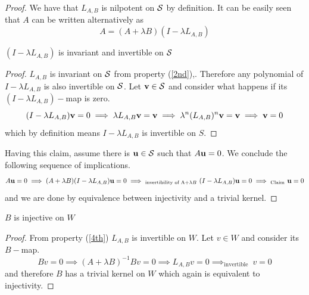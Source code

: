 \begin{proof}
    We have that $L_{A,B}$ is nilpotent on $\mathcal{S}$ by definition. It can be easily seen that $A$ can be written alternatively as
    \begin{equation}\label{expForA}
        A=(A+\lambda B)(I-\lambda L_{A,B})
    \end{equation}

    \begin{claim}\label{cl:newinv}
        $(I-\lambda L_{A,B})$ is invariant and invertible on $\mathcal{S}$
    \end{claim}
    \begin{proof}
         $L_{A,B}$ is invariant on $\mathcal{S}$ from property (\ref{2nd}),. Therefore any polynomial of  $I-\lambda L_{A,B}$ is also invertible on $\mathcal{S}$. Let $\mathbf{v}\in \mathcal{S}$ and consider what happens if its $(I-\lambda L_{A,B})-$map is zero. $$(I-\lambda L_{A,B})\mathbf{v}=0\implies \lambda L_{A,B}\mathbf{v} = \mathbf{v}\implies \lambda^n (L_{A,B})^n\mathbf{v}=\mathbf{v}\implies \mathbf{v}=0 $$which by definition means $I-\lambda L_{A,B}$ is invertible on $S$.
    \end{proof}
    Having this claim, assume there is $\mathbf{u}\in \mathcal{S}$ such that $A\mathbf{u}=0$. We conclude the following sequence of implications. $$A\mathbf{u}=0\implies (A+\lambda B)(I-\lambda L_{A,B})\mathbf{u}=0\implies_{\text{invertibility of A+}\lambda B}\ (I-\lambda L_{A,B})\mathbf{u}=0\implies_{\text{Claim}}\ \mathbf{u}=0 $$ and we are done by equivalence between injectivity and a trivial kernel.
    
\end{proof}
\newpage
\begin{lemma}\label{injectivityB}
    $B$ is injective on $W$
\end{lemma}

\begin{proof}
    From property (\ref{4th}) $L_{A,B}$ is invertible on $W$. Let $v\in W$ and consider its $B-$map. $$Bv=0\implies (A+\lambda B)^{-1}Bv=0\implies L_{A,B} v=0\implies_{\text{invertible}}\  v=0$$and therefore $B$ has a trivial kernel on $W$ which again is equivalent to injectivity.
\end{proof}



